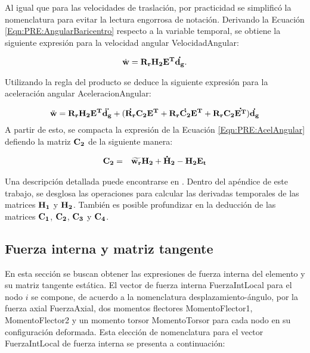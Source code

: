 Al igual que para las velocidades de traslación, por practicidad se simplificó la nomenclatura para evitar la lectura engorrosa de notación. Derivando la Ecuación \eqref{Eqn:PRE:AngularBaricentro} respecto a la variable temporal, se obtiene la siguiente expresión para la velocidad angular \gls{VelocidadAngular}:

\begin{equation}
	\label{Eqn:PRE:VelAngular}
	\dot{\bf{w}}=\bf{R}_r\bf{H}_2\bf{E}^T\dot{{\bf{d_g}}}.
\end{equation}

Utilizando la regla del producto se deduce la siguiente expresión para la aceleración angular \gls{AceleracionAngular}:

\begin{equation}
	\label{Eqn:PRE:AcelAngular}
	\ddot{\bf{w}}=\bf{R}_r\bf{H}_2\bf{E}^T\ddot{{\bf{d_g}}}+ (\dot{\bf{R}_r} \bf{C}_2 \bf{E}^T + \bf{R}_r \dot{\bf{C}_2} \bf{E}^T + \bf{R}_r \bf{C}_2 \dot{\bf{E}^T}   ) \dot{ \bf{d}_g }
\end{equation}
A partir de esto, se compacta la expresión de la Ecuación \eqref{Eqn:PRE:AcelAngular} defiendo la matriz $\bf{C}_2$ de la siguiente manera:

\begin{eqnarray}
	\label{Eqn:PRE:DefC}
	\bf{C}_2&=&\widetilde{\bf{w}_r}\bf{H}_2+\bf{\dot{H}_2}-\bf{H}_2\bf{E}_t\\
\end{eqnarray}

Una descripción detallada puede encontrarse en \citep{Le2014}. Dentro del apéndice de este trabajo, se desglosa las operaciones para calcular las derivadas temporales de las matrices $\bf{H}_1$ y $\bf{H}_2$. También es posible profundizar en la deducción de las matrices $\bf{C_1}$, $\bf{C_2}$, $\bf{C_3}$ y $\bf{C_4}$.

\subsection{Fuerza interna y matriz tangente}\label{Sec:PRE:Interna}

En esta sección se buscan obtener las expresiones de fuerza interna del elemento y su matriz tangente estática. El vector de fuerza interna \gls{FuerzaIntLocal} para el nodo $i$ se compone, de acuerdo a la nomenclatura desplazamiento-ángulo, por la fuerza axial \gls{FuerzaAxial}, dos momentos flectores \gls{MomentoFlector1}, \gls{MomentoFlector2} y un momento torsor \gls{MomentoTorsor} para cada nodo en su configuración deformada. Esta elección de nomenclatura para el vector \gls{FuerzaIntLocal} de fuerza interna se presenta a continuación:

